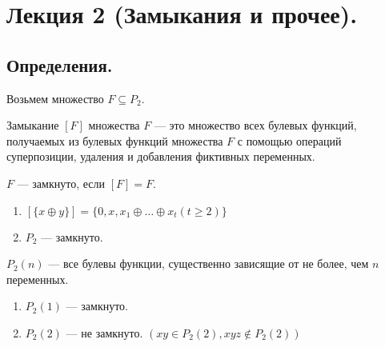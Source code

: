 \section{Лекция 2 (Замыкания и прочее).}

\subsection{Определения.}

Возьмем множество $F \subseteq P_2$.

\begin{definition}
	Замыкание $[F]$ множества $F$ --- это множество всех булевых функций, получаемых из булевых функций множества $F$ с помощью операций суперпозиции, удаления и добавления фиктивных переменных.
\end{definition}

\begin{definition}
	$F$ --- замкнуто, если $[F] = F$.
\end{definition}

\begin{enumerate}
	\item
	$[\{x \oplus y\}] = \{0, x, x_1 \oplus \ldots \oplus x_t (t \ge 2)\}$
	\item
	$P_2$ --- замкнуто.	
\end{enumerate}

\begin{definition}
	$P_2(n)$ --- все булевы функции, существенно зависящие от не более, чем $n$ переменных.
\end{definition}

\begin{enumerate}
	\item
	$P_2(1)$ --- замкнуто.
	\item
	$P_2(2)$ --- не замкнуто. $\left( xy \in P_2(2), xyz \not\in P_2(2) \right)$
\end{enumerate}
